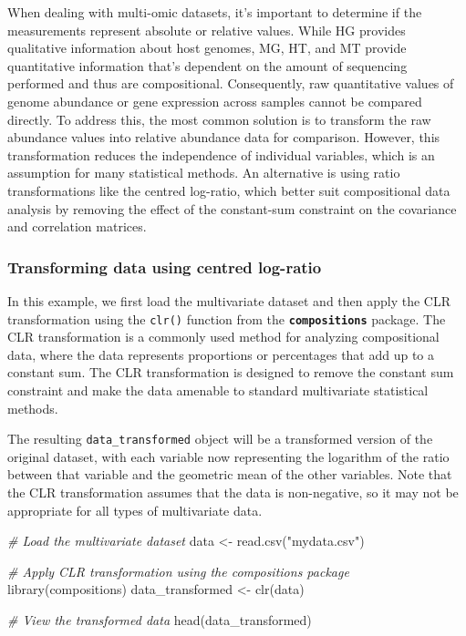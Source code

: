 \documentclass[
]{book}
\newenvironment{Shaded}{\begin{snugshade}}{\end{snugshade}}
\newcommand{\CommentTok}[1]{\textcolor[rgb]{0.56,0.35,0.01}{\textit{#1}}}
\newcommand{\FunctionTok}[1]{\textcolor[rgb]{0.00,0.00,0.00}{#1}}
\newcommand{\NormalTok}[1]{#1}
\newcommand{\OtherTok}[1]{\textcolor[rgb]{0.56,0.35,0.01}{#1}}
\newcommand{\StringTok}[1]{\textcolor[rgb]{0.31,0.60,0.02}{#1}}
\begin{document}
When dealing with multi-omic datasets, it's important to determine if the measurements represent absolute or relative values. While HG provides qualitative information about host genomes, MG, HT, and MT provide quantitative information that's dependent on the amount of sequencing performed and thus are compositional. Consequently, raw quantitative values of genome abundance or gene expression across samples cannot be compared directly. To address this, the most common solution is to transform the raw abundance values into relative abundance data for comparison. However, this transformation reduces the independence of individual variables, which is an assumption for many statistical methods. An alternative is using ratio transformations like the centred log-ratio, which better suit compositional data analysis by removing the effect of the constant-sum constraint on the covariance and correlation matrices.

\hypertarget{transforming-data-using-centred-log-ratio}{%
\subsubsection*{Transforming data using centred log-ratio}\label{transforming-data-using-centred-log-ratio}}

In this example, we first load the multivariate dataset and then apply the CLR transformation using the \texttt{clr()} function from the \textbf{\texttt{compositions}} package. The CLR transformation is a commonly used method for analyzing compositional data, where the data represents proportions or percentages that add up to a constant sum. The CLR transformation is designed to remove the constant sum constraint and make the data amenable to standard multivariate statistical methods.

The resulting \texttt{data\_transformed} object will be a transformed version of the original dataset, with each variable now representing the logarithm of the ratio between that variable and the geometric mean of the other variables. Note that the CLR transformation assumes that the data is non-negative, so it may not be appropriate for all types of multivariate data.

\begin{Shaded}
\begin{Highlighting}[]
\CommentTok{\# Load the multivariate dataset}
\NormalTok{data }\OtherTok{\textless{}{-}} \FunctionTok{read.csv}\NormalTok{(}\StringTok{"mydata.csv"}\NormalTok{)}

\CommentTok{\# Apply CLR transformation using the compositions package}
\FunctionTok{library}\NormalTok{(compositions)}
\NormalTok{data\_transformed }\OtherTok{\textless{}{-}} \FunctionTok{clr}\NormalTok{(data)}

\CommentTok{\# View the transformed data}
\FunctionTok{head}\NormalTok{(data\_transformed)}
\end{Highlighting}
\end{Shaded}
\end{document}

